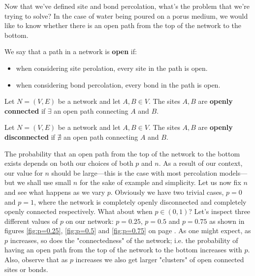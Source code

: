 Now that we've defined site and bond percolation, what's the problem that we're trying to solve? In the case of water being poured on a porus medium, we would like to know
whether there is an open path from the top of the network to the bottom.

\begin{definition}\label{def:open}
  We say that a path in a network is \textbf{open} if:
  \begin{itemize}
    \item when considering site perolation, every site in the path is open.
    \item when considering bond percolation, every bond in the path is open.
  \end{itemize}
\end{definition}

\begin{definition}\label{def:openly connected}
  Let $N=(V, E)$ be a network and let $A, B \in V$. The sites $A, B$ are \textbf{openly connected} if $\exists$ an open path connecting $A$ and $B$.
\end{definition}

\begin{definition}\label{def:openly disconnected}
  Let $N=(V, E)$ be a network and let $A, B \in V$. The sites $A, B$ are \textbf{openly disconnected} if $\nexists$ an open path connecting $A$ and $B$.
\end{definition}

The probability that an open path from the top of the network to the bottom exists depends on both our choices of both $p$ and $n$. As a result of our context, our value for $n$ should be
large---this is the case with most percolation models---but we shall use small $n$ for the sake of example and simplicity. Let us now fix $n$ and see what happens as we vary $p$. Obviously we have two trivial cases, $p=0$ and $p=1$,
where the network is completely openly disconnected and completely openly connected respectively.
What about when $p\in(0,1)$? Let's inspect three different values of $p$ on our network: $p=0.25$, $p=0.5$ and $p=0.75$ as shown in figures \ref{fig:p=0.25}, \ref{fig:p=0.5} and
\ref{fig:p=0.75} on page \pageref{fig:probabilities}.
As one might expect, as $p$ increases, so does the "connectedness" of the network; i.e. the probability of having an open path from the top of the network to the bottom increases
with $p$. Also, observe that as $p$ increases we also get larger "clusters" of open connected sites or bonds.

